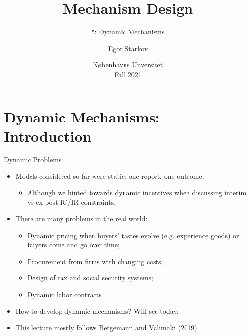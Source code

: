 \documentclass[english,10pt
,aspectratio=169
]{beamer}
\title{Mechanism Design}
\subtitle{5: Dynamic Mechanisms}
\author{Egor Starkov}
\date{K{\o}benhavns Unversitet \\
	Fall 2021}
\begin{document}
	\frame[plain]{\titlepage}


\section{Dynamic Mechanisms: Introduction}

\begin{frame}{Dynamic Problems}
\begin{itemize}
	\item Models considered so far were static: one report, one outcome.
	\begin{itemize}
		\item Although we hinted towards dynamic incentives when discussing interim vs ex post IC/IR constraints.
	\end{itemize}
	\item There are many  problems in the real world:
	\begin{itemize}
		\item Dynamic pricing when buyers' tastes evolve (e.g. experience goods) or buyers come and go over time;
		\item Procurement from firms with changing costs;
		\item Design of tax and social security systems;
		\item Dynamic labor contracts
	\end{itemize}
	\item How to develop dynamic mechanisms? Will see today.
	\item This lecture mostly follows \href{https://www.aeaweb.org/articles?id=10.1257/jel.20180892}{\uline{Bergemann and V{\"a}lim{\"a}ki (2019)}}.
\end{itemize}
\end{frame}
\end{document}
